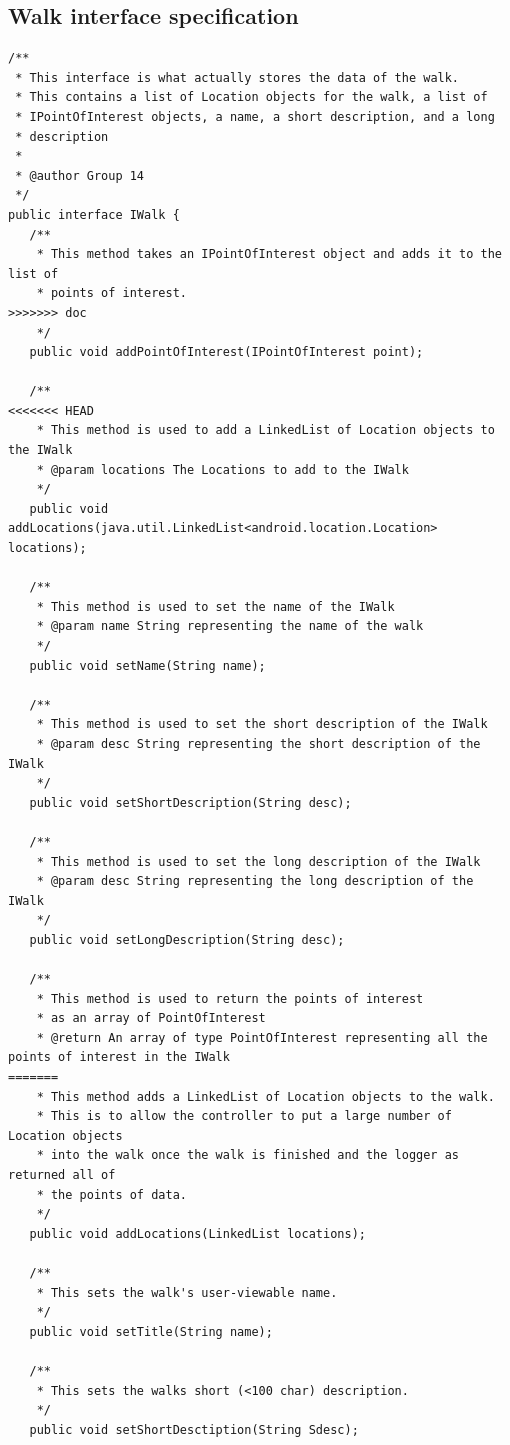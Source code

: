 \documentclass{project}
\begin{document}
\newpage

\subsection{Walk interface specification}
\begin{verbatim}/**
 * This interface is what actually stores the data of the walk. 
 * This contains a list of Location objects for the walk, a list of
 * IPointOfInterest objects, a name, a short description, and a long
 * description
 *
 * @author Group 14
 */
public interface IWalk {
   /**
    * This method takes an IPointOfInterest object and adds it to the list of
    * points of interest.
>>>>>>> doc
    */
   public void addPointOfInterest(IPointOfInterest point);
   
   /**
<<<<<<< HEAD
    * This method is used to add a LinkedList of Location objects to the IWalk
    * @param locations The Locations to add to the IWalk
    */
   public void addLocations(java.util.LinkedList<android.location.Location> locations);
   
   /**
    * This method is used to set the name of the IWalk
    * @param name String representing the name of the walk
    */
   public void setName(String name);
   
   /**
    * This method is used to set the short description of the IWalk
    * @param desc String representing the short description of the IWalk
    */
   public void setShortDescription(String desc);
   
   /**
    * This method is used to set the long description of the IWalk
    * @param desc String representing the long description of the IWalk
    */
   public void setLongDescription(String desc);
   
   /**
    * This method is used to return the points of interest
    * as an array of PointOfInterest
    * @return An array of type PointOfInterest representing all the points of interest in the IWalk
=======
    * This method adds a LinkedList of Location objects to the walk. 
    * This is to allow the controller to put a large number of Location objects
    * into the walk once the walk is finished and the logger as returned all of
    * the points of data.
    */
   public void addLocations(LinkedList locations);
   
   /**
    * This sets the walk's user-viewable name.
    */
   public void setTitle(String name);
   
   /**
    * This sets the walks short (<100 char) description.
    */
   public void setShortDesctiption(String Sdesc);


\end{verbatim}
\end{document}
